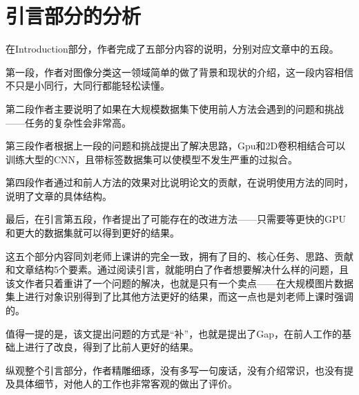 \chapter{引言部分的分析}\label{chap:introduction}

在Introduction部分，作者完成了五部分内容的说明，分别对应文章中的五段。

第一段，作者对图像分类这一领域简单的做了背景和现状的介绍，这一段内容相信不只是小同行，大同行都能轻松读懂。

第二段作者主要说明了如果在大规模数据集下使用前人方法会遇到的问题和挑战——任务的复杂性会非常高。

第三段作者根据上一段的问题和挑战提出了解决思路，Gpu和2D卷积相结合可以训练大型的CNN，且带标签数据集可以使模型不发生严重的过拟合。

第四段作者通过和前人方法的效果对比说明论文的贡献，在说明使用方法的同时，说明了文章的具体结构。

最后，在引言第五段，作者提出了可能存在的改进方法——只需要等更快的GPU和更大的数据集就可以得到更好的结果。

这五个部分内容同刘老师上课讲的完全一致，拥有了目的、核心任务、思路、贡献和文章结构5个要素。通过阅读引言，就能明白了作者想要解决什么样的问题，且该文作者只着重讲了一个问题的解决，也就是只有一个卖点——在大规模图片数据集上进行对象识别得到了比其他方法更好的结果，而这一点也是刘老师上课时强调的。

值得一提的是，该文提出问题的方式是“补”，也就是提出了Gap，在前人工作的基础上进行了改良，得到了比前人更好的结果。

纵观整个引言部分，作者精雕细琢，没有多写一句废话，没有介绍常识，也没有提及具体细节，对他人的工作也非常客观的做出了评价。

